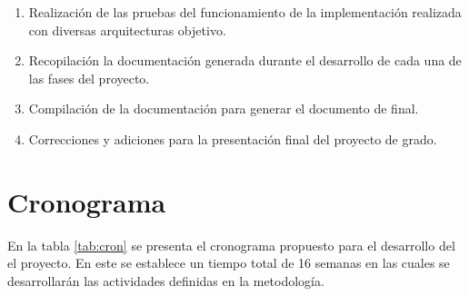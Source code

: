 \documentclass[12pt]{article}
\begin{document}
   \begin{enumerate}[label=\thesubsection.\arabic*., wide, labelindent=2em, leftmargin=5em]
        \item Realización de las pruebas del funcionamiento de la implementación realizada con diversas arquitecturas objetivo.
        \item Recopilación la documentación generada durante el desarrollo de cada una de las fases del proyecto.
        \item Compilación de la documentación para generar el documento de final.
        \item Correcciones y adiciones para la presentación final del proyecto de grado.
    \end{enumerate}  


    \pagebreak

    \section{Cronograma}

    En la tabla \ref{tab:cron} se presenta el cronograma propuesto para el desarrollo del el proyecto. En este se establece un tiempo total de 16 semanas en las cuales se desarrollarán las actividades definidas en la metodología.
\end{document}
